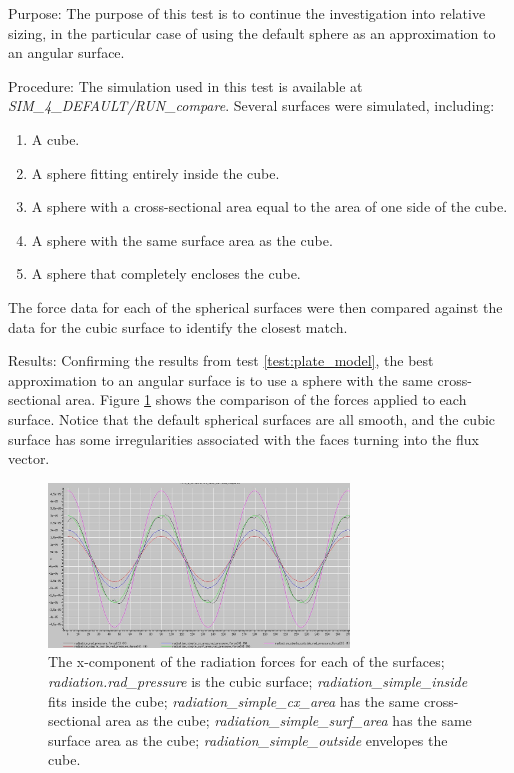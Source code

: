 \clearpage
{}
\label{test:sim4}
\begin{description}
\item{Purpose:}\newline
The purpose of this test is to continue the investigation into relative sizing, in the particular case of using the default sphere as an approximation to an angular surface.
\item{Procedure:}\newline
The simulation used in this test is available at \textit{SIM\_4\_DEFAULT/RUN\_compare}.
Several surfaces were simulated, including:
\begin{enumerate}
\item A cube.
\item A sphere fitting entirely inside the cube.
\item A sphere with a cross-sectional area equal to the area of one side of the cube.
\item A sphere with the same surface area as the cube.
\item A sphere that completely encloses the cube.
\end{enumerate}

The force data for each of the spherical surfaces were then compared against the data for the cubic surface to identify the closest match.
\item{Results:}\newline
Confirming the results from test \ref{test:plate_model}, the best approximation
to an angular surface is to use a sphere with the same cross-sectional area.
Figure \ref{fig:ivv_sim4forces} shows the comparison of the forces applied to each surface.  Notice that the default spherical surfaces are all smooth, and the cubic surface has some irregularities associated with the faces turning into the flux vector.

     \begin{figure}[!ht]
     \begin{center}
     \includegraphics[width=80mm]{figs/Plate_mod/sim4forces.jpg}
     \caption{The x-component of the radiation forces for each of the surfaces;
     \textit{radiation.rad\_pressure} is the cubic surface;
     \textit{radiation\_simple\_inside} fits inside the cube;
     \textit{radiation\_simple\_cx\_area} has the same cross-sectional area as
     the cube; \textit{radiation\_simple\_surf\_area} has the same surface area
     as the cube; \textit{radiation\_simple\_outside} envelopes the cube.}
     \label{fig:ivv_sim4forces}
     \end{center}
     \end{figure}


\end{description}


